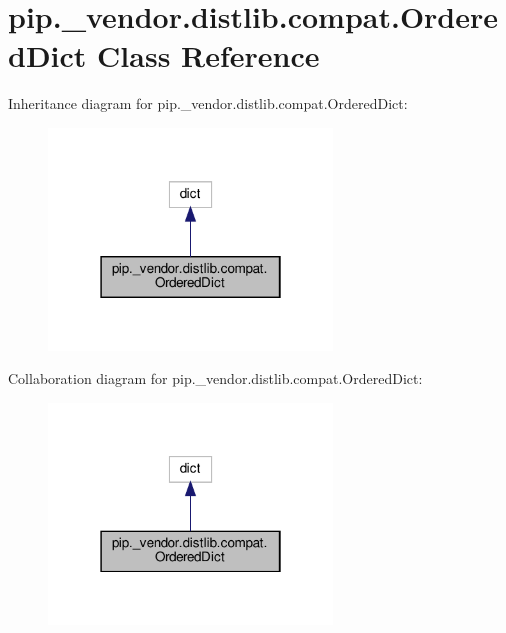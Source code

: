 \hypertarget{classpip_1_1__vendor_1_1distlib_1_1compat_1_1OrderedDict}{}\section{pip.\+\_\+vendor.\+distlib.\+compat.\+Ordered\+Dict Class Reference}
\label{classpip_1_1__vendor_1_1distlib_1_1compat_1_1OrderedDict}


Inheritance diagram for pip.\+\_\+vendor.\+distlib.\+compat.\+Ordered\+Dict\+:
\nopagebreak
\begin{figure}[H]
\begin{center}
\leavevmode
\includegraphics[width=214pt]{classpip_1_1__vendor_1_1distlib_1_1compat_1_1OrderedDict__inherit__graph}
\end{center}
\end{figure}


Collaboration diagram for pip.\+\_\+vendor.\+distlib.\+compat.\+Ordered\+Dict\+:
\nopagebreak
\begin{figure}[H]
\begin{center}
\leavevmode
\includegraphics[width=214pt]{classpip_1_1__vendor_1_1distlib_1_1compat_1_1OrderedDict__coll__graph}
\end{center}
\end{figure}
